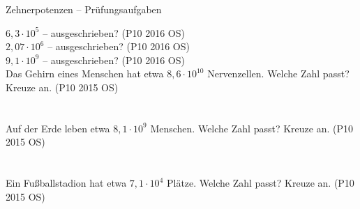 \begin{aufgabe}{Zehnerpotenzen – Prüfungsaufgaben}
\begin{teile}
\teil $6{,}3 \cdot 10^{5}$ – ausgeschrieben? \hfill (P10 2016 OS) \\ \leerfeld
\teil $2{,}07 \cdot 10^{6}$ – ausgeschrieben? \hfill (P10 2016 OS) \\ \leerfeld
\teil $9{,}1 \cdot 10^{9}$ – ausgeschrieben? \hfill (P10 2016 OS) \\ \leerfeld
\teil Das Gehirn eines Menschen hat etwa $8{,}6 \cdot 10^{10}$ Nervenzellen. Welche Zahl passt? Kreuze an. \hfill (P10 2015 OS)\\  \\  \\ 
\teil Auf der Erde leben etwa $8{,}1 \cdot 10^{9}$ Menschen. Welche Zahl passt? Kreuze an. \hfill (P10 2015 OS)\\  \\  \\ 
\teil Ein Fußballstadion hat etwa $7{,}1 \cdot 10^{4}$ Plätze. Welche Zahl passt? Kreuze an. \hfill (P10 2015 OS)\\  \\  \\ 
\end{teile}
\end{aufgabe}

